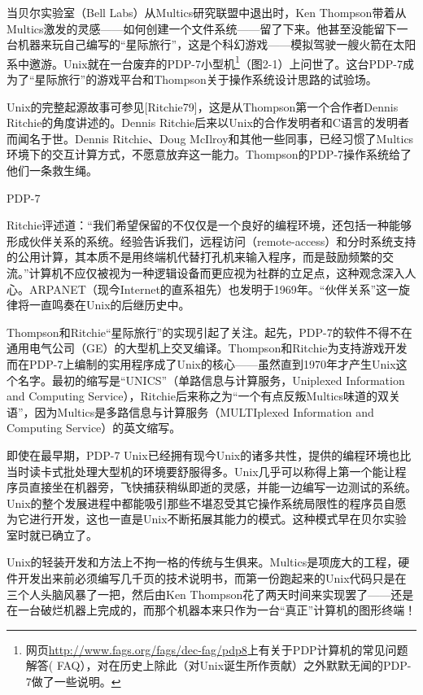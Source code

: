 \documentclass[12pt,oneside]{book}
\begin{document}
\begin{common-format}
当贝尔实验室（Bell Labs）从Multics研究联盟中退出时，Ken Thompson带着从Multics激发的灵感——如何创建一个文件系统——留了下来。他甚至没能留下一台机器来玩自己编写的“星际旅行”，这是个科幻游戏——模拟驾驶一艘火箭在太阳系中邀游。Unix就在一台废弃的PDP-7小型机\footnote{网页\href{http://www.fags.org/fags/dec-fag/pdp8}{http://www.fags.org/fags/dec-fag/pdp8}上有关于PDP计算机的常见问题解答( FAQ），对在历史上除此（对Unix诞生所作贡献）之外默默无闻的PDP-7做了一些说明。}（图2-1）上问世了。这台PDP-7成为了“星际旅行”的游戏平台和Thompson关于操作系统设计思路的试验场。

Unix的完整起源故事可参见[Ritchie79]，这是从Thompson第一个合作者Dennis Ritchie的角度讲述的。Dennis Ritchie后来以Unix的合作发明者和C语言的发明者而闻名于世。Dennis Ritchie、Doug McIlroy和其他一些同事，已经习惯了Multics环境下的交互计算方式，不愿意放弃这一能力。Thompson的PDP-7操作系统给了他们一条救生绳。

\begin{fig}[2]{PDP-7}
\label{fig:PDP-7}
\end{fig}

Ritchie评述道：“我们希望保留的不仅仅是一个良好的编程环境，还包括一种能够形成伙伴关系的系统。经验告诉我们，远程访问（remote-access）和分时系统支持的公用计算，其本质不是用终端机代替打孔机来输入程序，而是鼓励频繁的交流。”计算机不应仅被视为一种逻辑设备而更应视为社群的立足点，这种观念深入人心。ARPANET（现今Internet的直系祖先）也发明于1969年。“伙伴关系”这一旋律将一直鸣奏在Unix的后继历史中。

Thompson和Ritchie“星际旅行”的实现引起了关注。起先，PDP-7的软件不得不在通用电气公司（GE）的大型机上交叉编译。Thompson和Ritchie为支持游戏开发而在PDP-7上编制的实用程序成了Unix的核心——虽然直到1970年才产生Unix这个名字。最初的缩写是“UNICS”（单路信息与计算服务，Uniplexed Information and Computing Service），Ritchie后来称之为“一个有点反叛Multics味道的双关语”，因为Multics是多路信息与计算服务（MULTIplexed Information and Computing Service）的英文缩写。

即使在最早期，PDP-7 Unix已经拥有现今Unix的诸多共性，提供的编程环境也比当时读卡式批处理大型机的环境要舒服得多。Unix几乎可以称得上第一个能让程序员直接坐在机器旁，飞快捕获稍纵即逝的灵感，并能一边编写一边测试的系统。Unix的整个发展进程中都能吸引那些不堪忍受其它操作系统局限性的程序员自愿为它进行开发，这也一直是Unix不断拓展其能力的模式。这种模式早在贝尔实验室时就已确立了。

Unix的轻装开发和方法上不拘一格的传统与生俱来。Multics是项庞大的工程，硬件开发出来前必须编写几千页的技术说明书，而第一份跑起来的Unix代码只是在三个人头脑风暴了一把，然后由Ken Thompson花了两天时间来实现罢了——还是在一台破烂机器上完成的，而那个机器本来只作为一台“真正”计算机的图形终端！


\end{common-format}
\end{document}
